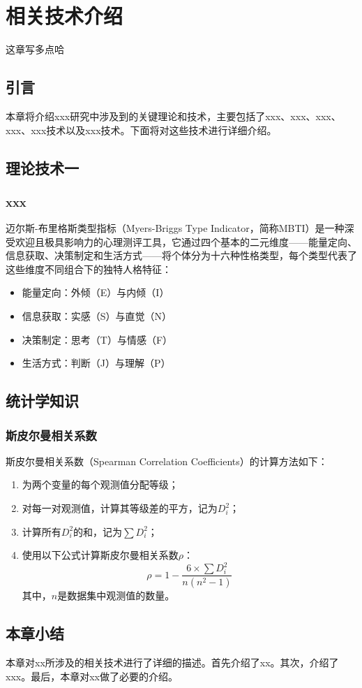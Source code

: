 
\chapter{相关技术介绍}
这章写多点哈
\section{引言}
本章将介绍xxx研究中涉及到的关键理论和技术，主要包括了xxx、xxx、xxx、xxx、xxx技术以及xxx技术。下面将对这些技术进行详细介绍。%

\section{理论技术一}
\subsection{xxx}
迈尔斯-布里格斯类型指标（Myers-Briggs Type Indicator，简称MBTI）是一种深受欢迎且极具影响力的心理测评工具，它通过四个基本的二元维度——能量定向、信息获取、决策制定和生活方式——将个体分为十六种性格类型，每个类型代表了这些维度不同组合下的独特人格特征：
\begin{itemize}
	\item 能量定向：外倾（E）与内倾（I）
	\item 信息获取：实感（S）与直觉（N）
	\item 决策制定：思考（T）与情感（F）
	\item 生活方式：判断（J）与理解（P）
\end{itemize}

\section{统计学知识}
\subsection{斯皮尔曼相关系数}
斯皮尔曼相关系数（Spearman Correlation Coefficients）的计算方法如下：
	
\begin{enumerate}
	\item 为两个变量的每个观测值分配等级；
	\item 对每一对观测值，计算其等级差的平方，记为$D_i^2$；
	\item 计算所有$D_i^2$的和，记为$\sum D_i^2$；
	\item 使用以下公式计算斯皮尔曼相关系数$\rho$：
	 \begin{equation}
	 	\rho = 1 - \frac{6 \times \sum D_i^2}{n(n^2 - 1)}
	 \end{equation}
	其中，$n$是数据集中观测值的数量。
\end{enumerate}



\section{本章小结}
本章对xx所涉及的相关技术进行了详细的描述。首先介绍了xx。其次，介绍了xxx。最后，本章对xx做了必要的介绍。


